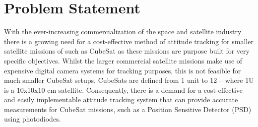 \section{Problem Statement}
With the ever-increasing commercialization of the space and satellite industry there is a growing need for a cost-effective method of attitude tracking for smaller satellite missions of such as CubeSat as these missions are purpose built for very specific objectives. Whilst the larger commercial satellite missions make use of expensive digital camera systems for tracking purposes, this is not feasible for much smaller CubeSat setups. CubeSats are defined from 1 unit to 12 -- where 1U is a 10x10x10 cm satellite. Consequently, there is a demand for a cost-effective and easily implementable attitude tracking system that can provide accurate measurements for CubeSat missions, such as a Position Sensitive Detector (PSD) using photodiodes.